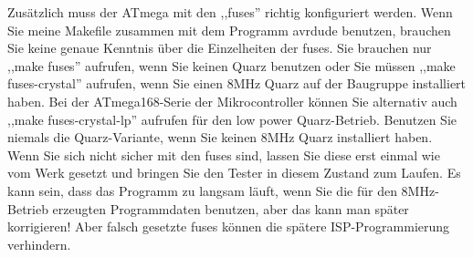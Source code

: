 Zusätzlich muss der ATmega mit den ,,fuses'' richtig konfiguriert werden.
Wenn Sie meine Makefile zusammen mit dem Programm avrdude \cite{avrdude} benutzen, brauchen Sie
keine genaue Kenntnis über die Einzelheiten der fuses.
Sie brauchen nur ,,make fuses'' aufrufen, wenn Sie keinen Quarz benutzen oder Sie
müssen ,,make fuses-crystal'' aufrufen, wenn Sie einen 8MHz Quarz auf der Baugruppe installiert haben.
Bei der ATmega168-Serie der Mikrocontroller können Sie alternativ auch
,,make fuses-crystal-lp'' aufrufen für den low power Quarz-Betrieb.
Benutzen Sie niemals die Quarz-Variante, wenn Sie keinen 8MHz Quarz installiert haben.
Wenn Sie sich nicht sicher mit den fuses sind, lassen Sie diese erst einmal wie
vom Werk gesetzt und bringen Sie den Tester in diesem Zustand zum Laufen.
Es kann sein, dass das Programm zu langsam läuft, wenn Sie die für den 8MHz-Betrieb 
erzeugten Programmdaten benutzen, aber das kann man später korrigieren!
Aber falsch gesetzte fuses können die spätere ISP-Programmierung verhindern.

